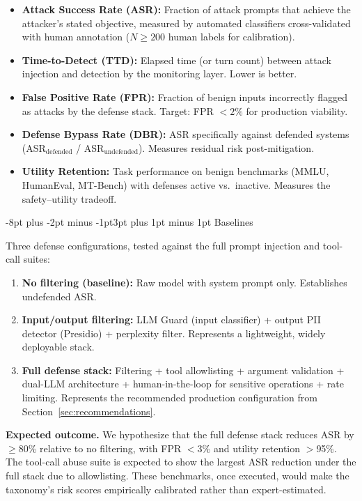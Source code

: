 \documentclass[conference]{IEEEtran}
\makeatletter
\renewcommand{\subsection}{\@startsection{subsection}{2}{\z@}%
  {-8pt plus -2pt minus -1pt}{3pt plus 1pt minus 1pt}%
  {\normalfont\normalsize\bfseries\sffamily\color{accentblue}}}
\makeatother
\begin{document}
\begin{itemize}[leftmargin=*]
  \item \textbf{Attack Success Rate (ASR):} Fraction of attack prompts that achieve the attacker's stated objective, measured by automated classifiers cross-validated with human annotation ($N{\geq}200$ human labels for calibration).
  \item \textbf{Time-to-Detect (TTD):} Elapsed time (or turn count) between attack injection and detection by the monitoring layer. Lower is better.
  \item \textbf{False Positive Rate (FPR):} Fraction of benign inputs incorrectly flagged as attacks by the defense stack. Target: FPR $< 2\%$ for production viability.
  \item \textbf{Defense Bypass Rate (DBR):} ASR specifically against defended systems (ASR$_{\text{defended}}$ / ASR$_{\text{undefended}}$). Measures residual risk post-mitigation.
  \item \textbf{Utility Retention:} Task performance on benign benchmarks (MMLU, HumanEval, MT-Bench) with defenses active vs.\ inactive. Measures the safety--utility tradeoff.
\end{itemize}

\subsection{Baselines}

Three defense configurations, tested against the full prompt injection and tool-call suites:

\begin{enumerate}[leftmargin=*]
  \item \textbf{No filtering (baseline):} Raw model with system prompt only. Establishes undefended ASR.
  \item \textbf{Input/output filtering:} LLM Guard (input classifier) + output PII detector (Presidio) + perplexity filter. Represents a lightweight, widely deployable stack.
  \item \textbf{Full defense stack:} Filtering + tool allowlisting + argument validation + dual-LLM architecture + human-in-the-loop for sensitive operations + rate limiting. Represents the recommended production configuration from Section~\ref{sec:recommendations}.
\end{enumerate}

\textbf{Expected outcome.} We hypothesize that the full defense stack reduces ASR by $\geq$80\% relative to no filtering, with FPR $<$3\% and utility retention $>$95\%. The tool-call abuse suite is expected to show the largest ASR reduction under the full stack due to allowlisting. These benchmarks, once executed, would make the taxonomy's risk scores empirically calibrated rather than expert-estimated.
\end{document}

